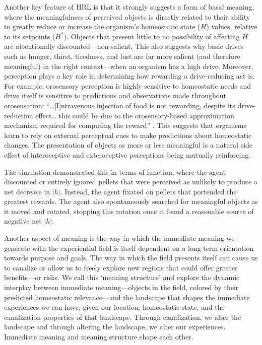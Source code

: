 Another key feature of HRL is that it strongly suggests a form of basal meaning, where the meaningfulness of perceived objects is directly related to their ability to greatly reduce or increase the organism's homeostatic state (\(H\)) values, relative to its setpoints (\(H^*\)). Objects that present little to no possibility of affecting \(H\) are attentionally discounted—non-salient. This also suggests why basic drives such as hunger, thirst, tiredness, and lust are far more salient (and therefore meaningful) in the right context—when an organism has a high drive. Moreover, perception plays a key role in determining how rewarding a drive-reducing act is. For example, orosensory perception is highly sensitive to homeostatic needs and drive itself is sensitive to predictions and observations made throughout orosensation: “…[I]ntravenous injection of food is not rewarding, despite its drive-reduction effect… this could be due to the orosensory-based approximation mechanism required for computing the reward” \cite{keramati_homeostatic_2014}. This suggests that organisms learn to rely on external perceptual cues to make predictions about homeostatic changes. The presentation of objects as more or less meaningful is a natural side effect of interoceptive and exteroceptive perceptions being mutually reinforcing.

The simulation demonstrated this in terms of function, where the agent discounted or entirely ignored pellets that were perceived as unlikely to produce a net decrease in \(|h|\). Instead, the agent fixated on pellets that portended the greatest rewards. The agent also spontaneously searched for meaningful objects as it moved and rotated, stopping this rotation once it found a reasonable source of negative net \(|h|\). 

Another aspect of meaning is the way in which the immediate meaning we generate with the experiential field is itself dependent on a long-term orientation towards purpose and goals. The way in which the field presents itself can cause us to canalize or allow us to freely explore new regions that could offer greater benefits—or risks. We call this ‘meaning structure’ and explore the dynamic interplay between immediate meaning—objects in the field, colored by their predicted homeostatic relevance—and the landscape that shapes the immediate experiences we can have, given our location, homeostatic state, and the canalization properties of that landscape. Through canalization, we alter the landscape and through altering the landscape, we alter our experiences. Immediate meaning and meaning structure shape each other. 
